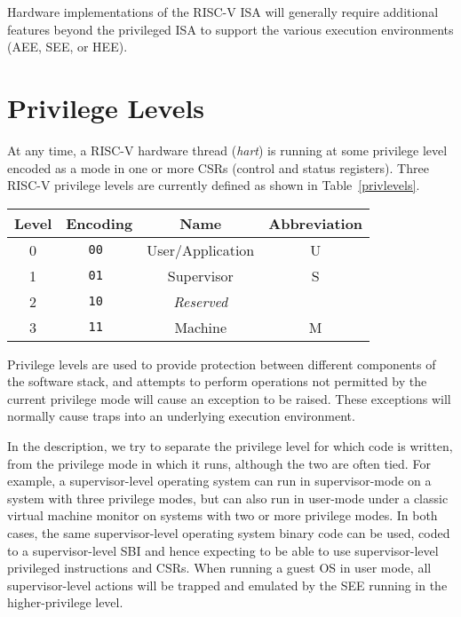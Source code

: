 Hardware implementations of the RISC-V ISA will generally require
additional features beyond the privileged ISA to support the various
execution environments (AEE, SEE, or HEE).

\section{Privilege Levels}

At any time, a RISC-V hardware thread ({\em hart}) is running at some
privilege level encoded as a mode in one or more CSRs (control and
status registers).  Three RISC-V privilege levels are currently defined
as shown in Table~\ref{privlevels}.

\begin{table*}[h!]
\begin{center}
\begin{tabular}{|c|c|c|c|}
  \hline
   Level & Encoding & Name      & Abbreviation \\ \hline  
   0     & \tt 00   & User/Application & U     \\ 
   1     & \tt 01   & Supervisor & S           \\ 
   2     & \tt 10   & {\em Reserved} &            \\ 
   3     & \tt 11   & Machine    & M           \\ 
  \hline
 \end{tabular}
\end{center}
\caption{RISC-V privilege levels.}
\label{privlevels}
\end{table*}

Privilege levels are used to provide protection between different
components of the software stack, and attempts to perform operations
not permitted by the current privilege mode will cause an exception to
be raised.  These exceptions will normally cause traps into an
underlying execution environment.

\begin{commentary}
In the description, we try to separate the privilege level for which
code is written, from the privilege mode in which it runs, although
the two are often tied.  For example, a supervisor-level operating
system can run in supervisor-mode on a system with three privilege
modes, but can also run in user-mode under a classic virtual machine
monitor on systems with two or more privilege modes.  In both cases,
the same supervisor-level operating system binary code can be used,
coded to a supervisor-level SBI and hence expecting to be able to use
supervisor-level privileged instructions and CSRs.  When running a
guest OS in user mode, all supervisor-level actions will be trapped
and emulated by the SEE running in the higher-privilege level.
\end{commentary}


